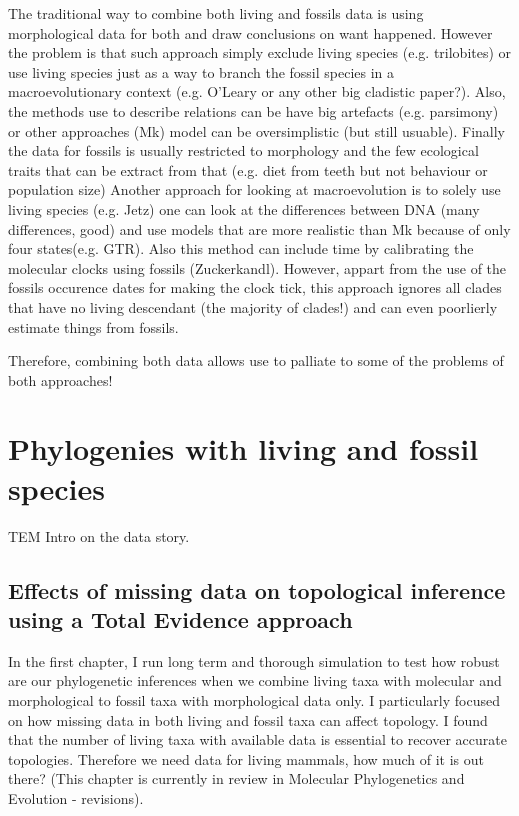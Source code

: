 The traditional way to combine both living and fossils data is using morphological data for both and draw conclusions on want happened.
However the problem is that such approach simply exclude living species (e.g. trilobites) or use living species just as a way to branch the fossil species in a macroevolutionary context (e.g. O'Leary or any other big cladistic paper?).
Also, the methods use to describe relations can be have big artefacts (e.g. parsimony) or other approaches (Mk) model can be oversimplistic (but still usuable).
Finally the data for fossils is usually restricted to morphology and the few ecological traits that can be extract from that (e.g. diet from teeth but not behaviour or population size)
Another approach for looking at macroevolution is to solely use living species (e.g. Jetz) one can look at the differences between DNA (many differences, good) and use models that are more realistic than Mk because of only four states(e.g. GTR).
Also this method can include time by calibrating the molecular clocks using fossils (Zuckerkandl).
However, appart from the use of the fossils occurence dates for making the clock tick, this approach ignores all clades that have no living descendant (the majority of clades!) and can even poorlierly estimate things from fossils.

Therefore, combining both data allows use to palliate to some of the problems of both approaches!




\section{Phylogenies with living and fossil species}

TEM Intro on the data story.

\subsection{Effects of missing data on topological inference using a Total Evidence approach}

In the first chapter, I run long term and thorough simulation to test how robust are our phylogenetic inferences when we combine living taxa with molecular and morphological to fossil taxa with morphological data only.
I particularly focused on how missing data in both living and fossil taxa can affect topology.
I found that the number of living taxa with available data is essential to recover accurate topologies.
Therefore we need data for living mammals, how much of it is out there?
(This chapter is currently in review in Molecular Phylogenetics and Evolution - revisions).

